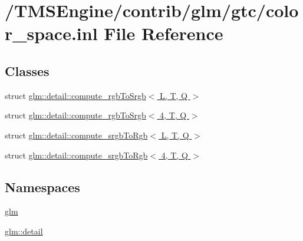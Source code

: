 \hypertarget{gtc_2color__space_8inl}{}\section{/\+T\+M\+S\+Engine/contrib/glm/gtc/color\+\_\+space.inl File Reference}
\label{gtc_2color__space_8inl}
\subsection*{Classes}
\begin{DoxyCompactItemize}
\item 
struct \hyperlink{structglm_1_1detail_1_1compute__rgb_to_srgb}{glm\+::detail\+::compute\+\_\+rgb\+To\+Srgb$<$ L, T, Q $>$}
\item 
struct \hyperlink{structglm_1_1detail_1_1compute__rgb_to_srgb_3_014_00_01_t_00_01_q_01_4}{glm\+::detail\+::compute\+\_\+rgb\+To\+Srgb$<$ 4, T, Q $>$}
\item 
struct \hyperlink{structglm_1_1detail_1_1compute__srgb_to_rgb}{glm\+::detail\+::compute\+\_\+srgb\+To\+Rgb$<$ L, T, Q $>$}
\item 
struct \hyperlink{structglm_1_1detail_1_1compute__srgb_to_rgb_3_014_00_01_t_00_01_q_01_4}{glm\+::detail\+::compute\+\_\+srgb\+To\+Rgb$<$ 4, T, Q $>$}
\end{DoxyCompactItemize}
\subsection*{Namespaces}
\begin{DoxyCompactItemize}
\item 
 \hyperlink{namespaceglm}{glm}
\item 
 \hyperlink{namespaceglm_1_1detail}{glm\+::detail}
\end{DoxyCompactItemize}
